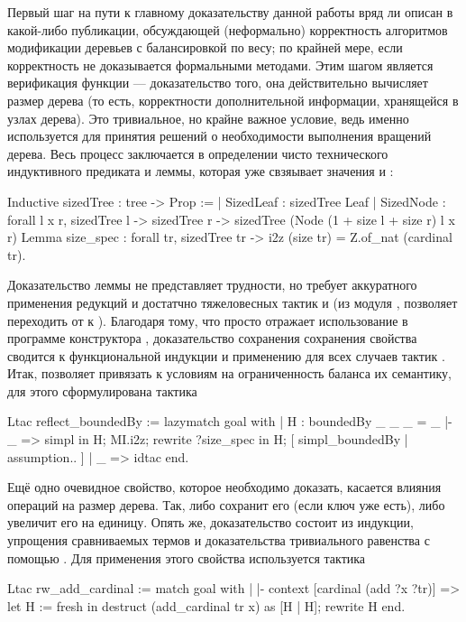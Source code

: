 \documentclass[a4paper,14pt]{extarticle}
\begin{document}
Первый шаг на пути к главному доказательству данной работы
вряд ли описан в какой-либо публикации,
обсуждающей (неформально) корректность алгоритмов модификации
деревьев с балансировкой по весу;
по крайней мере, если корректность не доказывается
формальными методами.
Этим шагом является верификация функции  ---
доказательство того, она действительно вычисляет размер дерева
(то есть, корректности дополнительной информации, хранящейся в узлах дерева).
Это тривиальное, но крайне важное условие,
ведь именно  используется для принятия
решений о необходимости выполнения вращений дерева.
Весь процесс заключается в определении
чисто технического индуктивного предиката
и леммы, которая уже свзяывает значения
 и :
\begin{coqcode}
Inductive sizedTree : tree -> Prop :=
  | SizedLeaf : sizedTree Leaf
  | SizedNode : forall l x r,
                sizedTree l ->
                sizedTree r ->
                sizedTree (Node
                  (1 + size l + size r)
                  l x r)
Lemma size_spec : forall tr, sizedTree tr ->
  i2z (size tr) = Z.of_nat (cardinal tr).
\end{coqcode}

Доказательство леммы не представляет трудности,
но требует аккуратного применения редукций
и достатчно тяжеловесных тактик 
и 
(из модуля ,
позволяет переходить от  к ).
Благодаря тому, что  просто
отражает использование в программе конструктора ,
доказательство сохранения сохранения свойства
 сводится к функциональной индукции
и применению для всех случаев тактик .
Итак,  позволяет
привязать к условиям на ограниченность баланса
их семантику, для этого сформулирована тактика
\begin{coqcode}
Ltac reflect_boundedBy := lazymatch goal with
  | H : boundedBy _ _ _ = _ |- _ =>
    simpl in H;
    MI.i2z;
    rewrite ?size_spec in H;
    [ simpl_boundedBy | assumption.. ]
  | _ => idtac
end.
\end{coqcode}

Ещё одно очевидное свойство, которое необходимо доказать,
касается влияния операций на размер дерева.
Так,  либо сохранит его
(если ключ уже есть), либо увеличит его на единицу.
Опять же, доказательство состоит из индукции,
упрощения сравниваемых термов и
доказательства тривиального равенства с помощью .
Для применения этого свойства используется тактика
\begin{coqcode}
Ltac rw_add_cardinal := match goal with
  | |- context [cardinal (add ?x ?tr)] =>
    let H := fresh in
    destruct (add_cardinal tr x) as [H | H];
    rewrite H
end.
\end{coqcode}
\end{document}
